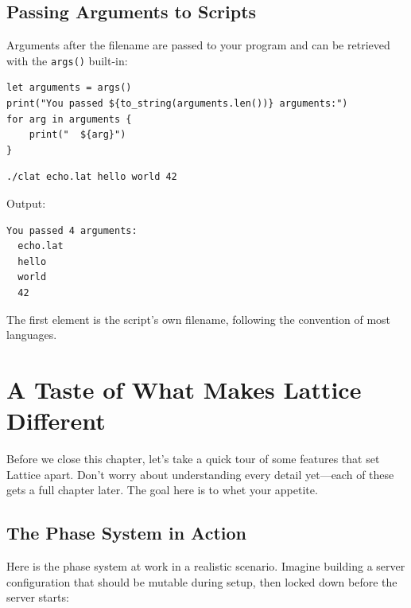 \subsection{Passing Arguments to Scripts}\label{subsec:script-args}

Arguments after the filename are passed to your program and can be retrieved with the \lstinline|args()| built-in:

\begin{lstlisting}[language=Lattice, caption={echo.lat --- reading command-line arguments}]
let arguments = args()
print("You passed ${to_string(arguments.len())} arguments:")
for arg in arguments {
    print("  ${arg}")
}
\end{lstlisting}

\begin{lstlisting}[language=bash, numbers=none]
./clat echo.lat hello world 42
\end{lstlisting}

Output:

\begin{lstlisting}[language=bash, numbers=none]
You passed 4 arguments:
  echo.lat
  hello
  world
  42
\end{lstlisting}

The first element is the script's own filename, following the convention of most languages.

\section{A Taste of What Makes Lattice Different}\label{sec:taste-different}

Before we close this chapter, let's take a quick tour of some features that set Lattice apart.
Don't worry about understanding every detail yet---each of these gets a full chapter later.
The goal here is to whet your appetite.

\subsection{The Phase System in Action}\label{subsec:phase-taste}

Here is the phase system at work in a realistic scenario.
Imagine building a server configuration that should be mutable during setup, then locked down before the server starts:

